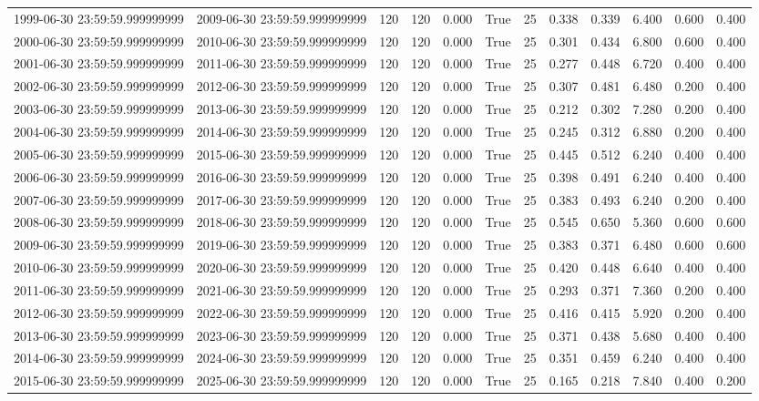 \begin{table}
\begin{tabular}{lccccccccccc}
1999-06-30 23:59:59.999999999 & 2009-06-30 23:59:59.999999999 & 120 & 120 & 0.000 & True & 25 & 0.338 & 0.339 & 6.400 & 0.600 & 0.400 \\
2000-06-30 23:59:59.999999999 & 2010-06-30 23:59:59.999999999 & 120 & 120 & 0.000 & True & 25 & 0.301 & 0.434 & 6.800 & 0.600 & 0.400 \\
2001-06-30 23:59:59.999999999 & 2011-06-30 23:59:59.999999999 & 120 & 120 & 0.000 & True & 25 & 0.277 & 0.448 & 6.720 & 0.400 & 0.400 \\
2002-06-30 23:59:59.999999999 & 2012-06-30 23:59:59.999999999 & 120 & 120 & 0.000 & True & 25 & 0.307 & 0.481 & 6.480 & 0.200 & 0.400 \\
2003-06-30 23:59:59.999999999 & 2013-06-30 23:59:59.999999999 & 120 & 120 & 0.000 & True & 25 & 0.212 & 0.302 & 7.280 & 0.200 & 0.400 \\
2004-06-30 23:59:59.999999999 & 2014-06-30 23:59:59.999999999 & 120 & 120 & 0.000 & True & 25 & 0.245 & 0.312 & 6.880 & 0.200 & 0.400 \\
2005-06-30 23:59:59.999999999 & 2015-06-30 23:59:59.999999999 & 120 & 120 & 0.000 & True & 25 & 0.445 & 0.512 & 6.240 & 0.400 & 0.400 \\
2006-06-30 23:59:59.999999999 & 2016-06-30 23:59:59.999999999 & 120 & 120 & 0.000 & True & 25 & 0.398 & 0.491 & 6.240 & 0.400 & 0.400 \\
2007-06-30 23:59:59.999999999 & 2017-06-30 23:59:59.999999999 & 120 & 120 & 0.000 & True & 25 & 0.383 & 0.493 & 6.240 & 0.200 & 0.400 \\
2008-06-30 23:59:59.999999999 & 2018-06-30 23:59:59.999999999 & 120 & 120 & 0.000 & True & 25 & 0.545 & 0.650 & 5.360 & 0.600 & 0.600 \\
2009-06-30 23:59:59.999999999 & 2019-06-30 23:59:59.999999999 & 120 & 120 & 0.000 & True & 25 & 0.383 & 0.371 & 6.480 & 0.600 & 0.600 \\
2010-06-30 23:59:59.999999999 & 2020-06-30 23:59:59.999999999 & 120 & 120 & 0.000 & True & 25 & 0.420 & 0.448 & 6.640 & 0.400 & 0.400 \\
2011-06-30 23:59:59.999999999 & 2021-06-30 23:59:59.999999999 & 120 & 120 & 0.000 & True & 25 & 0.293 & 0.371 & 7.360 & 0.200 & 0.400 \\
2012-06-30 23:59:59.999999999 & 2022-06-30 23:59:59.999999999 & 120 & 120 & 0.000 & True & 25 & 0.416 & 0.415 & 5.920 & 0.200 & 0.400 \\
2013-06-30 23:59:59.999999999 & 2023-06-30 23:59:59.999999999 & 120 & 120 & 0.000 & True & 25 & 0.371 & 0.438 & 5.680 & 0.400 & 0.400 \\
2014-06-30 23:59:59.999999999 & 2024-06-30 23:59:59.999999999 & 120 & 120 & 0.000 & True & 25 & 0.351 & 0.459 & 6.240 & 0.400 & 0.400 \\
2015-06-30 23:59:59.999999999 & 2025-06-30 23:59:59.999999999 & 120 & 120 & 0.000 & True & 25 & 0.165 & 0.218 & 7.840 & 0.400 & 0.200 \\
\bottomrule
\end{tabular}
\end{table}
